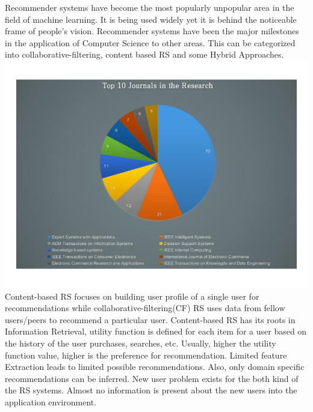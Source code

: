 \documentclass[12pt,a4paper]{article}
\begin{document}
	Recommender systems have become the most popularly unpopular area in the field of machine learning. It is being used widely yet it is behind the noticeable frame of people's vision. Recommender systems have been the major milestones in the application of Computer Science to other areas. This can be categorized into collaborative-filtering, content based RS and some Hybrid Approaches.\\
	\includegraphics[width=\linewidth]{images/Untitled1.png}\\
Content-based RS focuses on building user profile of a single user for recommendations while collaborative-filtering(CF) RS uses data from fellow users/peers to recommend a particular user. Content-based RS has its roots in Information Retrieval, utility function is defined for each item for a user based on the history of the user purchases, searches, etc. Usually, higher the utility function value, higher is the preference for recommendation. Limited feature Extraction leads to limited possible recommendations. Also, only domain specific recommendations can be inferred. New user problem exists for the both kind of the RS systems. Almost no information is present about the new users into the application environment.\\
\end{document}
